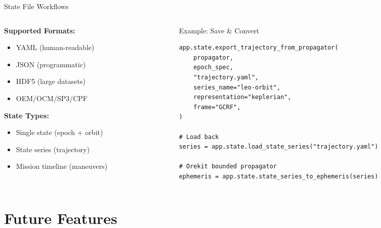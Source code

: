 \documentclass[aspectratio=169,12pt]{beamer}
\begin{document}
\begin{frame}[fragile]{State File Workflows}
    \begin{columns}
        \begin{column}{0.5\textwidth}
            \textbf{Supported Formats:}
            \begin{itemize}
                \item YAML (human-readable)
                \item JSON (programmatic)
                \item HDF5 (large datasets)
                \item OEM/OCM/SP3/CPF
            \end{itemize}
            \vspace{0.3cm}
            \textbf{State Types:}
            \begin{itemize}
                \item Single state (epoch + orbit)
                \item State series (trajectory)
                \item Mission timeline (maneuvers)
            \end{itemize}
        \end{column}
        \begin{column}{0.5\textwidth}
            \begin{block}{Example: Save \& Convert}
                \begin{verbatim}
app.state.export_trajectory_from_propagator(
    propagator,
    epoch_spec,
    "trajectory.yaml",
    series_name="leo-orbit",
    representation="keplerian",
    frame="GCRF",
)

# Load back
series = app.state.load_state_series("trajectory.yaml")

# Orekit bounded propagator
ephemeris = app.state.state_series_to_ephemeris(series)
                \end{verbatim}
            \end{block}
        \end{column}
    \end{columns}
\end{frame}

\section{Future Features}
\end{document}
